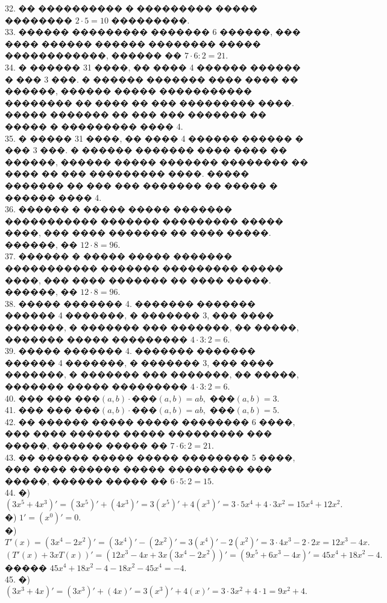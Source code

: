 \documentclass[12pt]{article}
\begin{document}
32. �� ���������� � ��������� ����� �������� $2\cdot5=10$ ���������.\\
33. ������ ��������� ������� 6 ������, ��� ���� ������ ������ �������� ����� ������������, ������ �� $7\cdot6:2=21.$\\
34. � ������ 31 ����, �� ���� 4 ������ ������ � ��� 3 ���. � ������ ������� ���� ���� �� ������, ������ ����� ����������� �������� �� ���� �� ��� ��������� ����. ����� ������� �� ��� ��� ������� �� ����� � ��������� ���� 4.\\
35. � ����� 31 ����, �� ���� 4 ������ ������ � ��� 3 ���. � ������ ������� ���� ���� �� ������, ������ ����� ������� �������� �� ���� �� ��� ��������� ����. ����� ������� �� ��� ��� ������� �� ����� � ������ ���� 4.\\
36. ������ � ����� ����� ������� ����������� ������� ��������� ����� ����, ��� ���� ������� �� ���� �����. ������, �� $12\cdot8=96.$\\
37. ������ � ����� ����� ������� ����������� ������� ��������� ����� ����, ��� ���� ������� �� ���� �����. ������, �� $12\cdot8=96.$\\
38. ����� ������� 4. ������� ������� ������ 4 �������, � ������� 3, ��� ���� �������, � ������� ��� �������, �� �����, ������� ����� ��������� $4\cdot3:2=6.$\\
39. ����� ������� 4. ������� ������� ������ 4 �������, � ������� 3, ��� ���� �������, � ������� ��� �������, �� �����, ������� ����� ��������� $4\cdot3:2=6.$\\
40. ��� ��� ���$(a,b)\cdot$���$(a,b)=ab,$ ���$(a,b)=3.$\\
41. ��� ��� ���$(a,b)\cdot$���$(a,b)=ab,$ ���$(a,b)=5.$\\
42. �� ������ ����� ����� �������� 6 ����, ��� ���� ������ ����� ��������� ��� �����, ������ ����� �� $7\cdot6:2=21.$\\
43. �� ������ ����� ����� �������� 5 ����, ��� ���� ������ ����� ��������� ��� �����, ������ ����� �� $6\cdot5:2=15.$\\
44. �) $(3x^5+4x^3)'=(3x^5)'+(4x^3)'=3(x^5)'+4(x^3)'=3\cdot5x^4+4\cdot3x^2=15x^4+12x^2.$\\
�) $1'=(x^0)'=0.$\\
�) $T'(x)=(3x^4-2x^2)'=(3x^4)'-(2x^2)'=3(x^4)'-2(x^2)'=3\cdot4x^3-2\cdot2x=12x^3-4x.$\\
$(T'(x)+3xT(x))'=(12x^3-4x+3x(3x^4-2x^2))'=(9x^5+6x^3-4x)'=45x^4+18x^2-4.$ ����� $45x^4+18x^2-4-18x^2-45x^4=-4.$\\
45. �) $(3x^3+4x)'=(3x^3)'+(4x)'=3(x^3)'+4(x)'=3\cdot3x^2+4\cdot 1=9x^2+4.$\\
\end{document}
